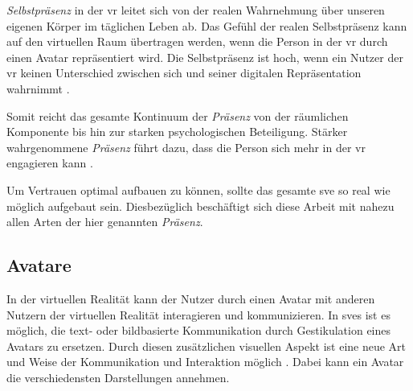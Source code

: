 \documentclass[a4paper,11pt]{article}%
\renewcommand{\\}{\vspace*{0.5\baselineskip} \newline}
\begin{document}
\textit{Selbstpräsenz} in der \ac{vr} leitet sich von der realen Wahrnehmung über unseren eigenen Körper im täglichen Leben ab. Das Gefühl der realen Selbstpräsenz kann auf den virtuellen Raum übertragen werden, wenn die Person in der \ac{vr} durch einen Avatar repräsentiert wird. Die Selbstpräsenz ist hoch, wenn ein Nutzer der \ac{vr} keinen Unterschied zwischen sich und seiner digitalen Repräsentation wahrnimmt \citep[S. 439]{schultze2010embodiment}.

Somit reicht das gesamte Kontinuum der \textit{Präsenz} von der räumlichen Komponente bis hin zur starken psychologischen Beteiligung. Stärker wahrgenommene \textit{Präsenz} führt dazu, dass die Person sich mehr in der \ac{vr} engagieren kann \citep{biocca2001criteria}.

Um Vertrauen optimal aufbauen zu können, sollte das gesamte \ac{sve} so real wie möglich aufgebaut sein. Diesbezüglich beschäftigt sich diese Arbeit mit nahezu allen Arten der hier genannten \textit{Präsenz}.
\newpage

\subsection{Avatare}
\label{Avatare}
In der virtuellen Realität kann der Nutzer durch einen Avatar mit anderen Nutzern der virtuellen Realität interagieren und kommunizieren.
In \ac{sve}s ist es möglich, die text- oder bildbasierte Kommunikation durch Gestikulation eines Avatars zu ersetzen. Durch diesen zusätzlichen visuellen Aspekt ist eine neue Art und Weise der Kommunikation und Interaktion möglich \citep[S. 81]{haslam2003social}.
Dabei kann ein Avatar die verschiedensten Darstellungen annehmen.
\end{document}

